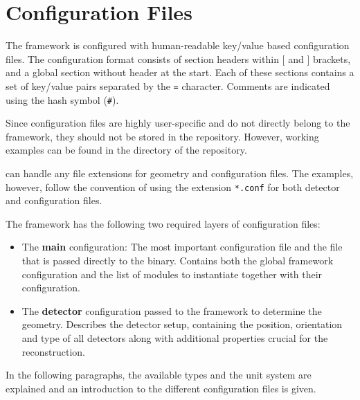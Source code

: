 \chapter{Configuration Files}
\label{ch:configuration_files}
The framework is configured with human-readable key/value based configuration files.
The configuration format consists of section headers within $[$ and $]$ brackets, and a global section without header at the start.
Each of these sections contains a set of key/value pairs separated by the \texttt{=} character.
Comments are indicated using the hash symbol (\texttt{\#}).

Since configuration files are highly user-specific and do not directly belong to the \corry framework, they should not be stored in the \corry repository.
However, working examples can be found in the  directory of the repository.

\corry can handle any file extensions for geometry and configuration files.
The examples, however, follow the convention of using the extension \texttt{*.conf} for both detector and configuration files.

The framework has the following two required layers of configuration files:
\begin{itemize}
\item The \textbf{main} configuration: The most important configuration file and the file that is passed directly to the binary.
Contains both the global framework configuration and the list of modules to instantiate together with their configuration.

\item The \textbf{detector} configuration passed to the framework to determine the geometry.
Describes the detector setup, containing the position, orientation and type of all detectors along with additional properties crucial for the reconstruction.
\end{itemize}

In the following paragraphs, the available types and the unit system are explained and an introduction to the different configuration files is given.

